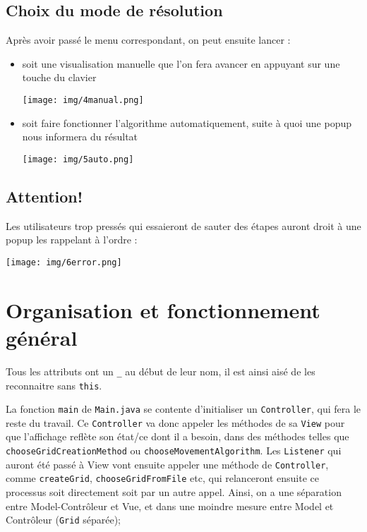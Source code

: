\documentclass[12pt]{scrartcl}
\begin{document}
\subsection{Choix du mode de résolution}
\label{sec:org4d3915e}
Après avoir passé le menu correspondant, on peut ensuite lancer :
\begin{itemize}
\item soit une visualisation manuelle que l'on fera avancer en appuyant sur une touche du clavier
\begin{center}
\texttt{[image: img/4manual.png]}
\end{center}
\item soit faire fonctionner l'algorithme automatiquement, suite à quoi une popup nous informera du résultat
\begin{center}
\texttt{[image: img/5auto.png]}
\end{center}
\end{itemize}
\subsection{Attention!}
\label{sec:org9950a8e}
Les utilisateurs trop pressés qui essaieront de sauter des étapes auront droit à une popup les rappelant à l'ordre :
\begin{center}
\texttt{[image: img/6error.png]}
\end{center}

\section{Organisation et fonctionnement général}
\label{sec:org343513b}
Tous les attributs ont un \texttt{\_} au début de leur nom, il est ainsi aisé de les reconnaitre sans \texttt{this}.

La fonction \texttt{main} de \texttt{Main.java} se contente d'initialiser un \texttt{Controller}, qui fera le reste du travail.
Ce \texttt{Controller} va donc appeler les méthodes de sa \texttt{View} pour que l'affichage reflète son état/ce dont il a besoin,
dans des méthodes telles que \texttt{chooseGridCreationMethod} ou \texttt{chooseMovementAlgorithm}.
Les \texttt{Listener} qui auront été passé à View vont ensuite appeler une méthode de \texttt{Controller}, comme \texttt{createGrid},
\texttt{chooseGridFromFile} etc, qui relanceront ensuite ce processus soit directement soit par un autre appel.
Ainsi, on a une séparation entre Model-Contrôleur et Vue, et dans une moindre mesure entre Model et Contrôleur
(\texttt{Grid} séparée);
\end{document}
